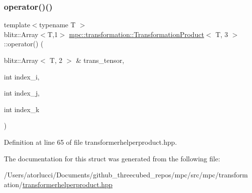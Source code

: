 \subsubsection{\texorpdfstring{operator()()}{operator()()}}
{\footnotesize\ttfamily template$<$typename T $>$ \\
blitz\+::\+Array$<$T,1$>$ \mbox{\hyperlink{structmpc_1_1transformation_1_1_transformation_product}{mpc\+::transformation\+::\+Transformation\+Product}}$<$ T, 3 $>$\+::operator() (\begin{DoxyParamCaption}\item[{blitz\+::\+Array$<$ T, 2 $>$ \&}]{trans\+\_\+tensor,  }\item[{int}]{index\+\_\+i,  }\item[{int}]{index\+\_\+j,  }\item[{int}]{index\+\_\+k }\end{DoxyParamCaption})\hspace{0.3cm}{\ttfamily [inline]}}



Definition at line 65 of file transformerhelperproduct.\+hpp.



The documentation for this struct was generated from the following file\+:\begin{DoxyCompactItemize}
\item 
/\+Users/atorlucci/\+Documents/github\+\_\+threecubed\+\_\+repos/mpc/src/mpc/transformation/\mbox{\hyperlink{transformerhelperproduct_8hpp}{transformerhelperproduct.\+hpp}}\end{DoxyCompactItemize}
